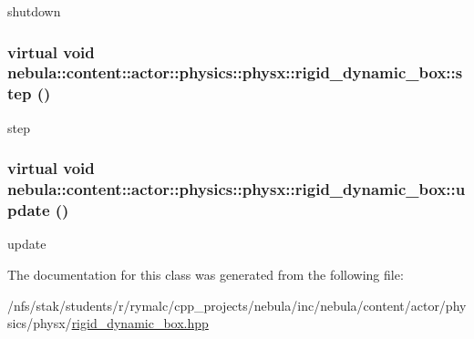 shutdown \hypertarget{classnebula_1_1content_1_1actor_1_1physics_1_1physx_1_1rigid__dynamic__box_a4ac8017f98a1169db046acd4ab178117}{
\subsubsection[{step}]{\setlength{\rightskip}{0pt plus 5cm}virtual void nebula::content::actor::physics::physx::rigid\_\-dynamic\_\-box::step ()}}
\label{classnebula_1_1content_1_1actor_1_1physics_1_1physx_1_1rigid__dynamic__box_a4ac8017f98a1169db046acd4ab178117}


step \hypertarget{classnebula_1_1content_1_1actor_1_1physics_1_1physx_1_1rigid__dynamic__box_af0b2a118a005904df613fa771c55da93}{
\subsubsection[{update}]{\setlength{\rightskip}{0pt plus 5cm}virtual void nebula::content::actor::physics::physx::rigid\_\-dynamic\_\-box::update ()}}
\label{classnebula_1_1content_1_1actor_1_1physics_1_1physx_1_1rigid__dynamic__box_af0b2a118a005904df613fa771c55da93}


update 

The documentation for this class was generated from the following file:\begin{DoxyCompactItemize}
\item 
/nfs/stak/students/r/rymalc/cpp\_\-projects/nebula/inc/nebula/content/actor/physics/physx/\hyperlink{physics_2physx_2rigid__dynamic__box_8hpp}{rigid\_\-dynamic\_\-box.hpp}\end{DoxyCompactItemize}

